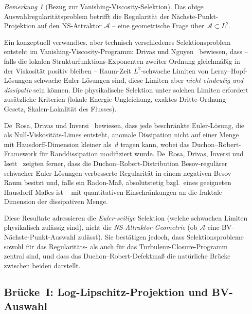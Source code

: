 \documentclass[12pt,a4paper]{article}
\theoremstyle{definition}
\theoremstyle{plain}
\theoremstyle{remark}
\newtheorem{remark}[definition]{Bemerkung}
\begin{document}
\begin{remark}[Bezug zur Vanishing-Viscosity-Selektion]
\label{rem:Drivas-VV-selection}
Das obige Auswahlregularitätsproblem betrifft die Regularität der
Nächste-Punkt-Projektion auf den NS-Attraktor $\mathcal{A}$ -- eine
geometrische Frage über $\mathcal{A} \subset L^2$.

Ein konzeptuell verwandtes, aber technisch verschiedenes Selektionsproblem
entsteht im Vanishing-Viscosity-Programm: Drivas und
Nguyen~\cite{DrivasNguyen2019} bewiesen, dass -- falls die lokalen
Strukturfunktions-Exponenten zweiter Ordnung gleichmäßig in der
Viskosität positiv bleiben -- Raum-Zeit $L^2$-schwache Limiten von
Leray--Hopf-Lösungen schwache Euler-Lösungen sind, diese Limiten
aber \emph{nicht-eindeutig und dissipativ} sein können.
Die physikalische Selektion unter solchen Limiten erfordert
zusätzliche Kriterien (lokale Energie-Ungleichung, exaktes
Dritte-Ordnung-Gesetz, Skalen-Lokalität des Flusses).

De~Rosa, Drivas und Inversi~\cite{DeRosaDrivasInversi2024} bewiesen, dass jede
beschränkte Euler-Lösung, die als Null-Viskositäts-Limes entsteht, anomale
Dissipation nicht auf einer Menge mit Hausdorff-Dimension kleiner als~$d$
tragen kann, wobei das Duchon--Robert-Framework für Randdissipation
modifiziert wurde.
De~Rosa, Drivas, Inversi und Isett~\cite{DeRosaDrivasInversiIsett2025}
zeigten ferner, dass die Duchon--Robert-Distribution Besov-regulärer
schwacher Euler-Lösungen verbesserte Regularität in einem negativen
Besov-Raum besitzt und, falls ein Radon-Maß, absolutstetig bzgl.\ eines
geeigneten Hausdorff-Maßes ist -- mit quantitativen Einschränkungen an
die fraktale Dimension der dissipativen Menge.

Diese Resultate adressieren die \emph{Euler-seitige} Selektion (welche
schwachen Limiten physikalisch zulässig sind), nicht die
\emph{NS-Attraktor-Geometrie} (ob $\mathcal{A}$ eine BV-Nächste-Punkt-Auswahl
zulässt). Sie bestätigen jedoch, dass Selektionsprobleme sowohl für das
Regularitäts- als auch für das Turbulenz-Closure-Programm zentral sind,
und dass das Duchon--Robert-Defektmaß die natürliche Brücke zwischen
beiden darstellt.
\end{remark}


\subsection*{Brücke~I: Log-Lipschitz-Projektion und BV-Auswahl}
\end{document}
